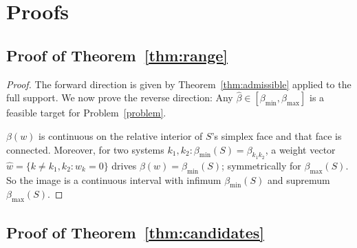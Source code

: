 \documentclass[11pt]{article}
\begin{document}


\appendix

\section{Proofs}

\subsection{Proof of Theorem~\ref{thm:range}}
\label{app:proof-range}

\theoremrange*

\begin{proof}
The forward direction is given by Theorem~\ref{thm:admissible} applied to the full support. We now prove the reverse direction: Any $\hat\beta \in [\beta_{\min}, \beta_{\max}]$ is a feasible target for Problem~\ref{problem}.

$\beta(w)$ is continuous on the relative interior of $S$'s simplex face and that face is connected. Moreover, for two systems $k_1, k_2: \beta_{\min}(S){=}\beta_{k_1k_2}$, a weight vector $\hat w = \{k\neq k_1,k_2:  w_k{=}0\}$ drives $\beta(w){=}\beta_{\min}(S)$; symmetrically for $\beta_{\max}(S)$. So the image is a continuous interval with infimum $\beta_{\min}(S)$ and supremum $\beta_{\max}(S)$.
\end{proof}

\subsection{Proof of Theorem~\ref{thm:candidates}}
\label{app:proof-candidates}

\theoremcandidates*
\end{document}
